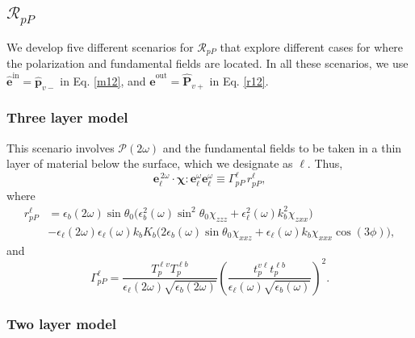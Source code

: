 \documentclass[aps,11pt]{revtex4}
\begin{document}
\subsection{\texorpdfstring{$\mathcal{R}_{pP}$}{RpP}}

We develop five different scenarios for $\mathcal{R}_{pP}$ that explore
different cases for where the polarization and fundamental fields are located.
In all these scenarios, we use
$\hat{\mathbf{e}}^{\mathrm{in}}=\hat{\mathbf{p}}_{v-}$ in Eq. \eqref{m12}, and
$\hat{\mathbf{e}}^{\mathrm{out}}=\hat{\mathbf{P}}_{v+}$ in Eq.
\eqref{r12}.

\subsubsection{Three layer model}

This scenario involves $\mathcal{P}(2\omega)$ and the fundamental fields to be
taken in a thin layer of material below the surface, which we designate as
$\ell$. Thus,
\begin{equation}\label{m80}
\mathbf{e}^{\,2\omega}_{\ell}\cdot\boldsymbol{\chi}:
\mathbf{e}^\omega_{\ell}\mathbf{e}^\omega_{\ell}
\equiv\Gamma^{\ell}_{pP}\,r^{\ell}_{pP}
,
\end{equation}
where
\begin{align}\label{m81}
r^{\ell}_{pP} &=
\epsilon_{b}(2\omega)\sin\theta_0
\Big(
  \epsilon^2_{b}(\omega)\sin^2\theta_0\chi_{zzz}
+ \epsilon^2_{\ell}(\omega)k^2_{b}\chi_{zxx}
\Big)\\
&- \epsilon_{\ell}(2\omega)\epsilon_{\ell}(\omega)k_{b}K_{b}
\Big(
  2\epsilon_{b}(\omega)\sin\theta_0\chi_{xxz}
+ \epsilon_{\ell}(\omega)k_{b}\chi_{xxx}\cos(3\phi) 
\Big),\nonumber
\end{align}
and  
\begin{equation}\label{m79}
\Gamma^{\ell}_{pP}=
\frac{T_{p}^{\ell v}T^{\ell b}_{p}}
     {\epsilon_{\ell}(2\omega)\sqrt{\epsilon_{b}(2\omega)}}
\left(
\frac{t_{p}^{v\ell}t^{\ell b}_{p}}
     {\epsilon_{\ell}(\omega)\sqrt{\epsilon_{b}(\omega)}}
\right)^{2} 
.  
\end{equation}


\subsubsection{Two layer model}
\end{document}
